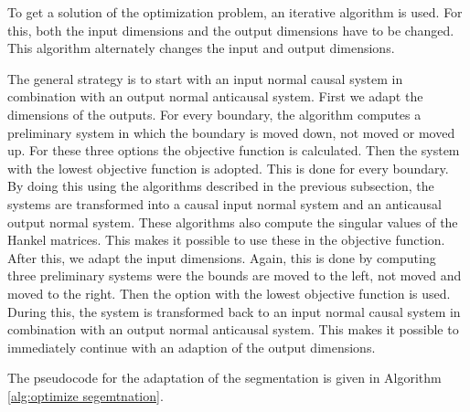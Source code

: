 \documentclass[numbers=noenddot,doctype=mastersthesis,BCOR=15mm,biblatex]{ldvbook}%
\begin{document}
To get a solution of the optimization problem, an iterative algorithm is used.
For this, both the input dimensions and the output dimensions have to be changed.
This algorithm alternately changes the input and output dimensions.

The general strategy is to start with an input normal causal system in combination with an output normal anticausal system.
First we adapt the dimensions of the outputs.
For every boundary, the algorithm computes a preliminary system in which the boundary is moved down, not moved or moved up.
For these three options the objective function is calculated. 
Then the system with the lowest objective function is adopted.
This is done for every boundary.
By doing this using the algorithms described in the previous subsection, the systems are transformed into a causal input normal system and an anticausal output normal system.
These algorithms also compute the singular values of the Hankel matrices. This makes it possible to use these in the objective function.
After this, we adapt the input dimensions.
Again, this is done by computing three preliminary systems were the 
  bounds are moved to the left, not moved and moved to the right.
Then the option with the lowest objective function is used.
During this, the system is transformed back to an input normal causal system in combination with an output normal anticausal system.
This makes it possible to immediately continue with an adaption of the output dimensions.

The pseudocode for the adaptation of the segmentation is given in Algorithm\,\ref{alg:optimize segemtnation}.
\end{document}
